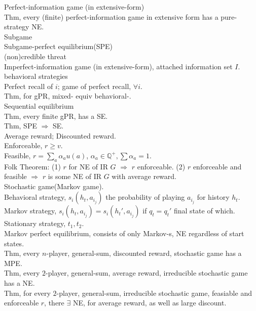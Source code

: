 \documentclass[paper=a4, fontsize=11pt]{scrartcl} %
\numberwithin{equation}{section} %
\numberwithin{figure}{section} %
\numberwithin{table}{section} %
\begin{document}
Perfect-information game (in extensive-form)\\
Thm, every (finite) perfect-information game in extensive form has a pure-strategy NE.\\
Subgame\\
Subgame-perfect equilibrium(SPE)\\
(non)credible threat\\
Imperfect-information game (in extensive-form), attached information set $I$.\\
behavioral strategies\\
Perfect recall of $i$; game of perfect recall, $\forall i$.\\
Thm, for gPR, mixed- equiv behavioral-.\\
Sequential equilibrium\\
Thm, every finite gPR, has a SE.\\
Thm, SPE $\Rightarrow$ SE.\\
Average reward; Discounted reward.\\
Enforceable, $r\geq v$.\\
Feasible, $r = \sum_a \alpha_a u(a)$, $\alpha_a\in \mathbb{Q}^+, \sum \alpha_a=1$.\\
Folk Theorem: (1) $r$ for NE of IR $G$ $\Rightarrow$ $r$ enforceable. (2) $r$ enforceable and feasible $\Rightarrow$ $r$ is some NE of IR $G$ with average reward.\\
Stochastic game(Markov game).\\
Behavioral strategy, $s_i(h_t,a_{i_j})$ the probability of playing $a_{i_j}$ for history $h_t$.\\
Markov strategy, $s_i(h_t, a_{i_j}) = s_i(h_t', a_{i_j})$ if $q_t=q_t'$ final state of which.\\
Stationary strategy, $t_1,t_2$.\\
Markov perfect equilibrium, consists of only Markov-s, NE regardless of start states.\\
Thm, every $n$-player, general-sum, discounted reward, stochastic game has a MPE.\\
Thm, every $2$-player, general-sum, average reward, irreducible stochastic game has a NE.\\
Thm, for every $2$-player, general-sum, irreducible stochastic game, feasiable and enforceable $r$, there $\exists$ NE, for average reward, as well as large discount.
\end{document}
